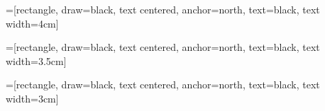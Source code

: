 \documentclass[headsepline,footsepline,footinclude=false,oneside,fontsize=12pt,paper=a4,listof=totoc,bibliography=totoc]{scrbook} %
\begin{document}
=[rectangle, draw=black,
        text centered, anchor=north, text=black, text width=4cm]

=[rectangle, draw=black,
        text centered, anchor=north, text=black, text width=3.5cm]

=[rectangle, draw=black,
        text centered, anchor=north, text=black, text width=3cm]




\frontmatter{}

%
%
%
%
{\hypersetup{linkcolor=black}\tableofcontents{}}

\mainmatter{}





\appendix{}

\end{document}
